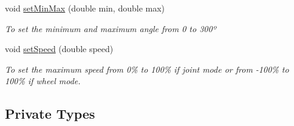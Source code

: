 \begin{DoxyCompactItemize}
void \hyperlink{class_a_x12_a914864d133f8cbaf95594747aaff55f2}{set\+Min\+Max} (double min, double max)
\begin{DoxyCompactList}\small\item\em To set the minimum and maximum angle from 0 to 300º \end{DoxyCompactList}\item 
void \hyperlink{class_a_x12_a95428eea4d5165b81d80e4ab38e33b7b}{set\+Speed} (double speed)
\begin{DoxyCompactList}\small\item\em To set the maximum speed from 0\% to 100\% if joint mode or from -\/100\% to 100\% if wheel mode. \end{DoxyCompactList}\end{DoxyCompactItemize}
\subsection*{Private Types}
